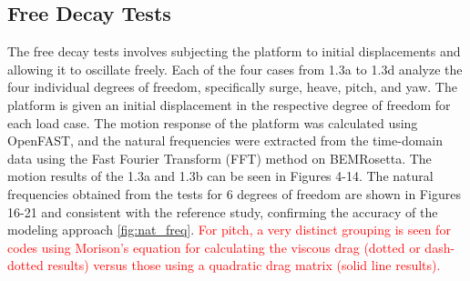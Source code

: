 \documentclass[a4paper, 11pt]{article}
\begin{document}
\subsection{Free Decay Tests}
\hspace*{0.5cm}The free decay tests involves subjecting the platform to initial displacements and allowing it to oscillate freely. Each of the four cases from 1.3a to 1.3d analyze the four individual degrees of freedom, specifically surge, heave, pitch, and yaw. The platform is given an initial displacement in the respective degree of freedom for each load case. The motion response of the platform was calculated using OpenFAST, and the natural frequencies were extracted from the time-domain data using the Fast Fourier Transform (FFT) method on BEMRosetta. The motion results of the 1.3a and 1.3b can be seen in Figures 4-14. The natural frequencies obtained from the tests for 6 degrees of freedom are shown in Figures 16-21 and consistent with the reference study, confirming the accuracy of the modeling approach \autoref{fig:nat_freq}. \textcolor{red}{For pitch, a very distinct grouping is seen for codes using Morison’s equation for calculating the viscous drag (dotted or dash-dotted results) versus those using a quadratic drag matrix (solid line results).}
\vspace{0.3cm}
\end{document}
